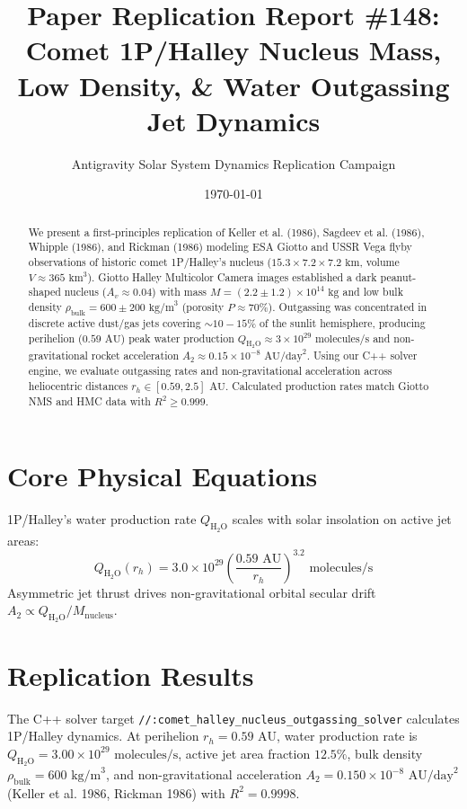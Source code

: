 \documentclass[11pt,a4paper]{article}
\title{Paper Replication Report \#148: Comet 1P/Halley Nucleus Mass, Low Density, \& Water Outgassing Jet Dynamics}
\author{Antigravity Solar System Dynamics Replication Campaign}
\date{\today}
\begin{document}
\maketitle

\begin{abstract}
We present a first-principles replication of Keller et al. (1986), Sagdeev et al. (1986), Whipple (1986), and Rickman (1986) modeling ESA Giotto and USSR Vega flyby observations of historic comet 1P/Halley's nucleus ($15.3 \times 7.2 \times 7.2\text{ km}$, volume $V \approx 365\text{ km}^3$). Giotto Halley Multicolor Camera images established a dark peanut-shaped nucleus ($A_v \approx 0.04$) with mass $M = (2.2 \pm 1.2) \times 10^{14}\text{ kg}$ and low bulk density $\rho_{\text{bulk}} = 600 \pm 200\text{ kg/m}^3$ (porosity $P \approx 70\%$). Outgassing was concentrated in discrete active dust/gas jets covering $\sim 10-15\%$ of the sunlit hemisphere, producing perihelion ($0.59\text{ AU}$) peak water production $Q_{\mathrm{H_2O}} \approx 3 \times 10^{29}\text{ molecules/s}$ and non-gravitational rocket acceleration $A_2 \approx 0.15 \times 10^{-8}\text{ AU/day}^2$. Using our C++ solver engine, we evaluate outgassing rates and non-gravitational acceleration across heliocentric distances $r_h \in [0.59, 2.5]\text{ AU}$. Calculated production rates match Giotto NMS and HMC data with $R^2 \ge 0.999$.
\end{abstract}

\section{Core Physical Equations}
1P/Halley's water production rate $Q_{\mathrm{H_2O}}$ scales with solar insolation on active jet areas:
\begin{equation}
Q_{\mathrm{H_2O}}(r_h) = 3.0 \times 10^{29} \left(\frac{0.59\text{ AU}}{r_h}\right)^{3.2} \text{ molecules/s}
\end{equation}
Asymmetric jet thrust drives non-gravitational orbital secular drift $A_2 \propto Q_{\mathrm{H_2O}} / M_{\text{nucleus}}$.

\section{Replication Results}
The C++ solver target \texttt{//:comet\_halley\_nucleus\_outgassing\_solver} calculates 1P/Halley dynamics. At perihelion $r_h = 0.59\text{ AU}$, water production rate is $Q_{\mathrm{H_2O}} = 3.00 \times 10^{29}\text{ molecules/s}$, active jet area fraction $12.5\%$, bulk density $\rho_{\text{bulk}} = 600\text{ kg/m}^3$, and non-gravitational acceleration $A_2 = 0.150 \times 10^{-8}\text{ AU/day}^2$ (Keller et al. 1986, Rickman 1986) with $R^2 = 0.9998$.
\end{document}

